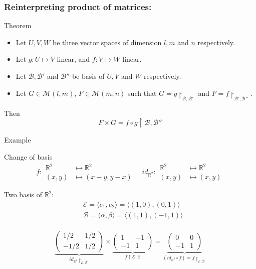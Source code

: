 \documentclass{beamer}
\begin{document}
\begin{frame}
  \frametitle{Reinterpreting product of matrices:}
  \begin{block}{Theorem}
    \begin{itemize}
    \item Let $U, V, W$ be three vector spaces of dimension $l, m$ and $n$ respectively.
    \item Let $g: U \mapsto V$ linear, and $f: V \mapsto W$ linear.
    \item Let $\mathcal{B}, \mathcal{B}'$ and $\mathcal{B}''$ be basis of $U, V$ and $W$ respectively.
    \item Let $G \in \mathcal{M}(l, m)$, $F \in \mathcal{M}(m, n)$ such that $G = g\restriction_{\mathcal{B}, \mathcal{B}'}$ and $F = f\restriction_{\mathcal{B'}, \mathcal{B}''}$.
    \end{itemize}

    Then
    \[F \times G =  f \circ g \restriction{\mathcal{B}, \mathcal{B}''}\]
    \end{block}
    
\end{frame}

\begin{frame}{Example}
  \begin{exampleblock}{Change of basis}
    \[f: \begin{aligned} \mathbb{R}^2 &\mapsto \mathbb{R}^2\\ (x,y) &\mapsto (x - y, y - x) \end{aligned} \quad id_{\mathbb{R}^2}: \begin{aligned} \mathbb{R}^2 &\mapsto \mathbb{R}^2\\ (x,y) &\mapsto (x , y) \end{aligned}\]

    Two basis of $\mathbb{R}^2 :$
    \[\begin{aligned}
    &\mathcal{E} = \langle e_1, e_2 \rangle = \langle (1,0), (0,1) \rangle \\ 
    &\mathcal{B} = \langle \alpha, \beta \rangle = \langle (1,1), (-1, 1) \rangle\\
    \end{aligned}\]

    \[\underbrace{\begin{pmatrix} 1/2& 1/2 \\ -1/2 & 1/2  \end{pmatrix}}_{id_{\mathbb{R}^2} \restriction_{\mathcal{E}, \mathcal{B}}} \times \underbrace{\begin{pmatrix} 1 & -1 \\ -1 & 1 \end{pmatrix}}_{f \restriction{\mathcal{E}}, \mathcal{E}} = \underbrace{\begin{pmatrix} 0 & 0\\ -1 & 1 \end{pmatrix}}_{(id_{\mathbb{R}^2} \circ f) = f \restriction_{\mathcal{E}, \mathcal{B}}}  \]
  \end{exampleblock}
\end{frame}
\end{document}
